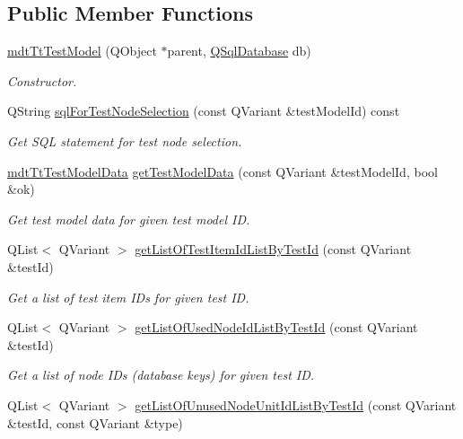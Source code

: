 \subsection*{Public Member Functions}
\begin{DoxyCompactItemize}
\item 
\hyperlink{classmdt_tt_test_model_aa21b9dd55ddc60ee59a5d804e45a163a}{mdt\-Tt\-Test\-Model} (Q\-Object $\ast$parent, \hyperlink{class_q_sql_database}{Q\-Sql\-Database} db)
\begin{DoxyCompactList}\small\item\em Constructor. \end{DoxyCompactList}\item 
Q\-String \hyperlink{classmdt_tt_test_model_a1c7dd9400f00516e054befbf4de53dbb}{sql\-For\-Test\-Node\-Selection} (const Q\-Variant \&test\-Model\-Id) const 
\begin{DoxyCompactList}\small\item\em Get S\-Q\-L statement for test node selection. \end{DoxyCompactList}\item 
\hyperlink{classmdt_tt_test_model_data}{mdt\-Tt\-Test\-Model\-Data} \hyperlink{classmdt_tt_test_model_a746b75259f66e2db65e93d5f58e3d65b}{get\-Test\-Model\-Data} (const Q\-Variant \&test\-Model\-Id, bool \&ok)
\begin{DoxyCompactList}\small\item\em Get test model data for given test model I\-D. \end{DoxyCompactList}\item 
Q\-List$<$ Q\-Variant $>$ \hyperlink{classmdt_tt_test_model_ae9845c11407a0b1db1e37fc40b6ae8b0}{get\-List\-Of\-Test\-Item\-Id\-List\-By\-Test\-Id} (const Q\-Variant \&test\-Id)
\begin{DoxyCompactList}\small\item\em Get a list of test item I\-Ds for given test I\-D. \end{DoxyCompactList}\item 
Q\-List$<$ Q\-Variant $>$ \hyperlink{classmdt_tt_test_model_ade332c342894ccfc87bb901427a9d440}{get\-List\-Of\-Used\-Node\-Id\-List\-By\-Test\-Id} (const Q\-Variant \&test\-Id)
\begin{DoxyCompactList}\small\item\em Get a list of node I\-Ds (database keys) for given test I\-D. \end{DoxyCompactList}\item 
Q\-List$<$ Q\-Variant $>$ \hyperlink{classmdt_tt_test_model_af3641e8ec4479fa63b0fd01dd6548a72}{get\-List\-Of\-Unused\-Node\-Unit\-Id\-List\-By\-Test\-Id} (const Q\-Variant \&test\-Id, const Q\-Variant \&type)

\end{DoxyCompactItemize}
